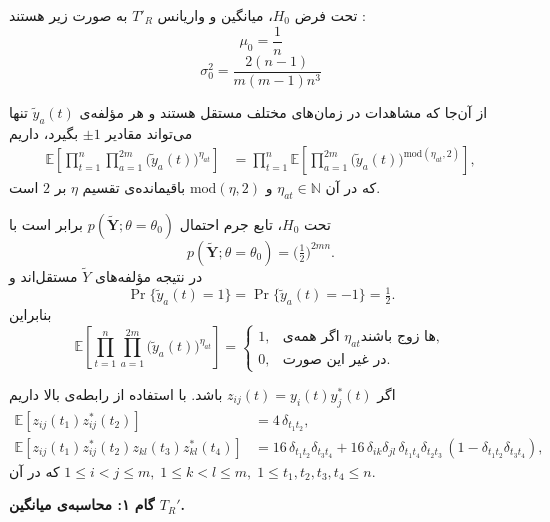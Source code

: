 \begin{قضیه}
	تحت فرض
	$H_0$،
	میانگین و واریانس 
	$T'_R$
	به صورت زیر هستند :
	\begin{equation}
		\mu_0=\frac{1}{n} \label{eq:39}
	\end{equation}	
	\begin{equation}
		\sigma_0^2=\frac{2(n-1)}{m(m-1)n^3} \label{eq:40}	
	\end{equation}
\end{قضیه}
\begin{اثبات}
	
	از آن‌جا که مشاهدات در زمان‌های مختلف مستقل هستند و هر مؤلفه‌ی $\tilde y_{a}(t)$ تنها می‌تواند مقادیر $\pm 1$ بگیرد، داریم
	\begin{align}
		\mathbb{E}\!\left[\prod_{t=1}^{n}\prod_{a=1}^{2m}\big(\tilde y_{a}(t)\big)^{\eta_{at}}\right]
		&=\prod_{t=1}^{n}\mathbb{E}\!\left[\prod_{a=1}^{2m}\big(\tilde y_{a}(t)\big)^{\mathrm{mod}(\eta_{at},2)}\right], \label{eq:B1}
	\end{align}
	که در آن $\eta_{at}\in\mathbb{N}$ و $\mathrm{mod}(\eta,2)$ باقیمانده‌ی تقسیم $\eta$ بر $2$ است.  
	
	تحت $H_{0}$، تابع جرم احتمال $p(\tilde{\mathbf{Y}};\theta=\theta_{0})$ برابر است با
	\[
	p(\tilde{\mathbf{Y}};\theta=\theta_{0})
	=\Big(\tfrac{1}{2}\Big)^{2mn}.
	\]
	در نتیجه مؤلفه‌های $\tilde Y$ مستقل‌اند و
	\[
	\Pr\{\tilde y_{a}(t)=1\}=\Pr\{\tilde y_{a}(t)=-1\}=\tfrac{1}{2}.
	\]
	بنابراین
	\[
	\mathbb{E}\!\left[\prod_{t=1}^{n}\prod_{a=1}^{2m}\big(\tilde y_{a}(t)\big)^{\eta_{at}}\right]
	=\begin{cases}
		1, & \text{اگر همه‌ی $\eta_{at}$ها زوج باشند},\\[4pt]
		0, & \text{در غیر این صورت}.
	\end{cases}
	\]
	
	اگر $z_{ij}(t)=y_{i}(t)y_{j}^{*}(t)$ باشد. با استفاده از رابطه‌ی بالا داریم
	\begin{align}
		\mathbb{E}\!\left[z_{ij}(t_{1})z_{ij}^{*}(t_{2})\right]&=4\,\delta_{t_{1}t_{2}}, \label{eq:B2}\\
		\mathbb{E}\!\left[z_{ij}(t_{1})z_{ij}^{*}(t_{2})z_{kl}(t_{3})z_{kl}^{*}(t_{4})\right]
		&=16\,\delta_{t_{1}t_{2}}\delta_{t_{3}t_{4}}
		+16\,\delta_{ik}\delta_{jl}\,\delta_{t_{1}t_{4}}\delta_{t_{2}t_{3}}\,(1-\delta_{t_{1}t_{2}}\delta_{t_{3}t_{4}}), \label{eq:B3}
	\end{align}
	که در آن $1\le i<j\le m,\;1\le k<l\le m,\;1\le t_{1},t_{2},t_{3},t_{4}\le n$.
	
	\medskip
	\noindent\textbf{گام ۱: محاسبه‌ی میانگین $T_{R}'$.}
	

\end{اثبات}
